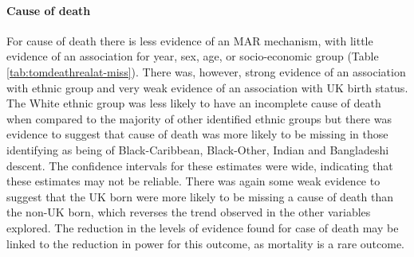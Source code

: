 \documentclass[11pt,twoside]{bristolthesis}
\begin{document}
  \hypertarget{cause-of-death}{%
  \paragraph{Cause of death}\label{cause-of-death}}
  
  For cause of death there is less evidence of an MAR mechanism, with little evidence of an association for year, sex, age, or socio-economic group (Table \ref{tab:tomdeathrealat-miss}). There was, however, strong evidence of an association with ethnic group and very weak evidence of an association with UK birth status. The White ethnic group was less likely to have an incomplete cause of death when compared to the majority of other identified ethnic groups but there was evidence to suggest that cause of death was more likely to be missing in those identifying as being of Black-Caribbean, Black-Other, Indian and Bangladeshi descent. The confidence intervals for these estimates were wide, indicating that these estimates may not be reliable. There was again some weak evidence to suggest that the UK born were more likely to be missing a cause of death than the non-UK born, which reverses the trend observed in the other variables explored. The reduction in the levels of evidence found for case of death may be linked to the reduction in power for this outcome, as mortality is a rare outcome.
  
  \newpage
  
\end{document}
